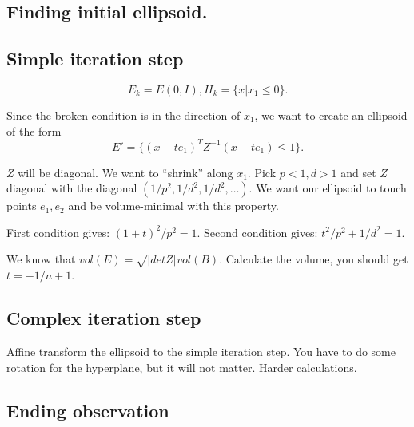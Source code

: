

\subsection{Finding initial ellipsoid.}


\subsection{Simple iteration step}

$$E_k = E(0,I), H_k = \{x| x_1 \leq 0 \}.$$

Since the broken condition is in the direction of $x_1$, we want to create an ellipsoid of the form
$$E' = \{ (x - te_1)^T Z^{-1} (x - te_1) \leq 1 \}.$$

$Z$ will be diagonal. We want to ``shrink'' along $x_1$. Pick $p < 1, d > 1$ and set
$Z$ diagonal with the diagonal $(1/p^2, 1/d^2, 1/d^2, \dots)$. We want our ellipsoid
to touch points $e_1, e_2$ and be volume-minimal with this property.

First condition gives: $(1+t)^2 / p^2 = 1$.
Second condition gives: $t^2/p^2 + 1/d^2 = 1$.

We know that $vol(E) = \sqrt{|det Z|} vol (B)$. Calculate the volume, you should get
$t = -1/n+1$.

\subsection{Complex iteration step}

Affine transform the ellipsoid to the simple iteration step. You have to do
some rotation for the hyperplane, but it will not matter. Harder calculations.

\subsection{Ending observation}


